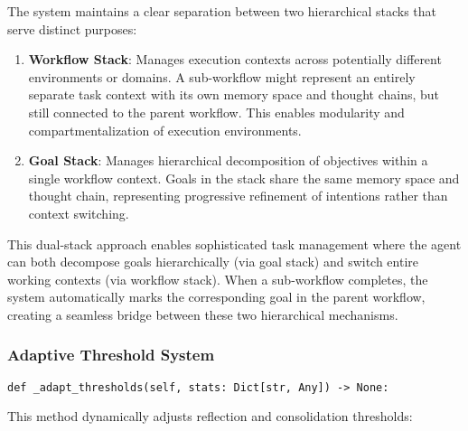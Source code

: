 \documentclass[12pt,a4paper]{article}
\begin{document}
The system maintains a clear separation between two hierarchical stacks that serve distinct purposes:

\begin{enumerate}[label=\arabic*.]
    \item \textbf{Workflow Stack}: Manages execution contexts across potentially different environments or domains. A sub-workflow might represent an entirely separate task context with its own memory space and thought chains, but still connected to the parent workflow. This enables modularity and compartmentalization of execution environments.

    \item \textbf{Goal Stack}: Manages hierarchical decomposition of objectives within a single workflow context. Goals in the stack share the same memory space and thought chain, representing progressive refinement of intentions rather than context switching.
\end{enumerate}

This dual-stack approach enables sophisticated task management where the agent can both decompose goals hierarchically (via goal stack) and switch entire working contexts (via workflow stack). When a sub-workflow completes, the system automatically marks the corresponding goal in the parent workflow, creating a seamless bridge between these two hierarchical mechanisms.

\subsubsection*{Adaptive Threshold System}
\begin{pageablecode}
\begin{verbatim}
def _adapt_thresholds(self, stats: Dict[str, Any]) -> None:
\end{verbatim}
\end{pageablecode}
This method dynamically adjusts reflection and consolidation thresholds:
\end{document}
